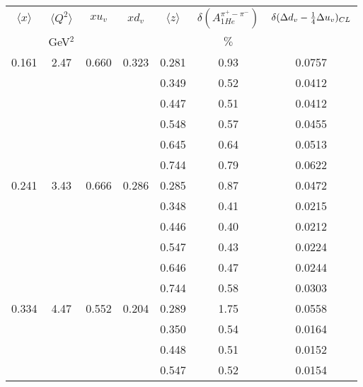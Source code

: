 \begin{table}[htbp]
\begin{center}
\begin{tabular}{|ccccc||c|c|}
\hline
$\langle x \rangle $   & $ \langle Q^2 \rangle $   & $x  u_v$ & $x d_v$ & $\langle z \rangle$ & $\delta \left(A_{1He}^{\pi^+ - \pi^-} \right)$  &
$\delta ( \Delta d_v -{1 \over 4} \Delta u_v )_{CL}$  \\
                       & GeV$^2$              &          &    &       &  $\%$    &                                                              \\ \hline \hline
   0.161 &    2.47 &   0.660 &    0.323 &    0.281 &      0.93 &    0.0757 \\
         &          &          &          &    0.349 &      0.52 &    0.0412 \\
         &          &          &          &    0.447 &      0.51 &    0.0412 \\
         &          &          &          &    0.548 &      0.57 &    0.0455 \\
         &          &          &          &    0.645 &      0.64 &    0.0513 \\
         &          &          &          &    0.744 &      0.79 &    0.0622 \\
   0.241 &    3.43 &   0.666 &    0.286 &    0.285 &      0.87 &    0.0472 \\
         &          &          &          &    0.348 &      0.41 &    0.0215 \\
         &          &          &          &    0.446 &      0.40 &    0.0212 \\
         &          &          &          &    0.547 &      0.43 &    0.0224 \\
         &          &          &          &    0.646 &      0.47 &    0.0244 \\
         &          &          &          &    0.744 &      0.58 &    0.0303 \\
   0.334 &    4.47 &   0.552 &    0.204 &    0.289 &      1.75 &    0.0558 \\
         &          &          &          &    0.350 &      0.54 &    0.0164 \\
         &          &          &          &    0.448 &      0.51 &    0.0152 \\
         &          &          &          &    0.547 &      0.52 &    0.0154 \\

\end{tabular}
\end{center}
\end{table}
